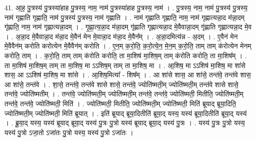 \documentclass[17pt]{extarticle}
\begin{document}
41. आ॒ह॒ पु॒त्रस्य॑ पु॒त्रस्या॑हाह पु॒त्रस्य॒ नाम॒ नाम॑ पु॒त्रस्या॑हाह पु॒त्रस्य॒ नाम॑ । . पु॒त्रस्य॒ नाम॒ नाम॑ पु॒त्रस्य॑ पु॒त्रस्य॒ नाम॑ गृह्णाति गृह्णाति॒ नाम॑ पु॒त्रस्य॑ पु॒त्रस्य॒ नाम॑ गृह्णाति । . नाम॑ गृह्णाति गृह्णाति॒ नाम॒ नाम॑ गृह्णात्यन्ना॒द म॑न्ना॒दम् गृ॑ह्णाति॒ नाम॒ नाम॑ गृह्णात्यन्ना॒दम् । . गृ॒ह्णा॒त्य॒न्ना॒द म॑न्ना॒दम् गृ॑ह्णाति गृह्णात्यन्ना॒द मे॒वैवान्ना॒दम् गृ॑ह्णाति गृह्णात्यन्ना॒द मे॒व । . अ॒न्ना॒द मे॒वैवान्ना॒द म॑न्ना॒द मे॒वैन॑ मेन मे॒वान्ना॒द म॑न्ना॒द मे॒वैन᳚म् । . अ॒न्ना॒दमित्य॑न्न - अ॒दम् । . ए॒वैन॑ मेन मे॒वैवैन॑म् करोति करोत्येन मे॒वैवैन॑म् करोति । . ए॒न॒म् क॒रो॒ति॒ क॒रो॒त्ये॒न॒ मे॒न॒म् क॒रो॒ति॒ ताम् ताम् क॑रोत्येन मेनम् करोति॒ ताम् । . क॒रो॒ति॒ ताम् ताम् क॑रोति करोति॒ ता मा॒शिष॑ मा॒शिष॒म् ताम् क॑रोति करोति॒ ता मा॒शिष᳚म् । . ता मा॒शिष॑ मा॒शिष॒म् ताम् ता मा॒शिष॒ मा ऽऽशिष॒म् ताम् ता मा॒शिष॒ मा । . आ॒शिष॒ मा ऽऽशिष॑ मा॒शिष॒ मा शा॑से शास॒ आ ऽऽशिष॑ मा॒शिष॒ मा शा॑से । . आ॒शिष॒मित्या᳚ - शिष᳚म् । . आ शा॑से शास॒ आ शा॑से॒ तन्त॑वे॒ तन्त॑वे शास॒ आ शा॑से॒ तन्त॑वे । . शा॒से॒ तन्त॑वे॒ तन्त॑वे शासे शासे॒ तन्त॑वे॒ ज्योति॑ष्मती॒म् ज्योति॑ष्मती॒म् तन्त॑वे शासे शासे॒ तन्त॑वे॒ ज्योति॑ष्मतीम् । . तन्त॑वे॒ ज्योति॑ष्मती॒म् ज्योति॑ष्मती॒म् तन्त॑वे॒ तन्त॑वे॒ ज्योति॑ष्मती॒ मितीति॒ ज्योति॑ष्मती॒म् तन्त॑वे॒ तन्त॑वे॒ ज्योति॑ष्मती॒ मिति॑ । . ज्योति॑ष्मती॒ मितीति॒ ज्योति॑ष्मती॒म् ज्योति॑ष्मती॒ मिति॑ ब्रूयाद् ब्रूया॒दिति॒ ज्योति॑ष्मती॒म् ज्योति॑ष्मती॒ मिति॑ ब्रूयात् । . इति॑ ब्रूयाद् ब्रूया॒दितीति॑ ब्रूया॒द् यस्य॒ यस्य॑ ब्रूया॒दितीति॑ ब्रूया॒द् यस्य॑ । . ब्रू॒या॒द् यस्य॒ यस्य॑ ब्रूयाद् ब्रूया॒द् यस्य॑ पु॒त्रः पु॒त्रो यस्य॑ ब्रूयाद् ब्रूया॒द् यस्य॑ पु॒त्रः । . यस्य॑ पु॒त्रः पु॒त्रो यस्य॒ यस्य॑ पु॒त्रो ऽजा॒तो ऽजा॑तः पु॒त्रो यस्य॒ यस्य॑ पु॒त्रो ऽजा॑तः । \newline
\end{document}

